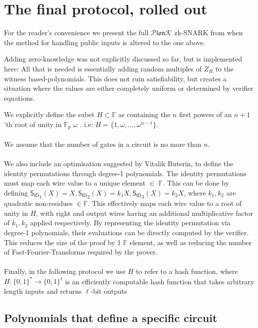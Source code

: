 \documentclass[11pt]{article} %
\newcommand{\plonk}{\ensuremath{\mathcal{P} \mathfrak{lon}\mathcal{K}}\xspace}
\newcommand{\F}{\ensuremath{\mathbb F}\xspace}
\newcommand{\idpoly}{\ensuremath{\mathsf{S_{ID}}}\xspace}
\begin{document}
 \section{The final protocol, rolled out}\label{sec:finalconst}
 For the reader's convenience we present the full \plonk zk-SNARK from \cite{plonk} when the method for handling public inputs is altered to the one above.

 Adding zero-knowledge was not explicitly discussed so far, but is implemented here:
 All that is needed is essentially adding random multiples of $Z_{H}$ to the witness based-polynomials. This does not ruin satisfiability, but creates a situation where the values are either completely uniform or determined by verifier equations.
 
 

 We explicitly define the subet $H\subset \F$ as containing the $n$ first powers of an $n+1$'th root of unity in $\F_p$ $\omega$ . i.e: $H = \{1, \omega, \ldots,\omega^{n-1}\}$.
 \\
 \\
 We assume that the number of gates in a circuit is no more than $n$.
 \\
 \\
 We also include an optimisation suggested by Vitalik Buterin, to define the identity permutations through degree-1 polynomials. The identity permutations must map each wire value to a unique element $\in$ \F. This can be done by defining $\idpoly_1(X) = X, \idpoly_2(X) = k_1X, \idpoly_3(X) = k_2X$, where $k_1, k_2$ are quadratic non-residues $\in \F$.
 This effectively maps each wire value to a root of unity in $H$, with right and output wires having an additional multiplicative factor of $k_1, k_2$ applied respectively.
 By representing the identity permutation via degree-1 polynomials, their evaluations can be directly computed by the verifier. This reduces the size of the proof by 1 \F element, as well as reducing the number of Fast-Fourier-Transforms required by the prover.
\\
\\
Finally, in the following protocol we use $H$ to refer to a hash function, where $H:\{0,1\}^*\to \{0,1\}^{\ell}$ is an efficiently computable hash function that takes arbitrary length inputs and returns $\ell$-bit outputs  

\subsection{Polynomials that define a specific circuit}
\end{document}
